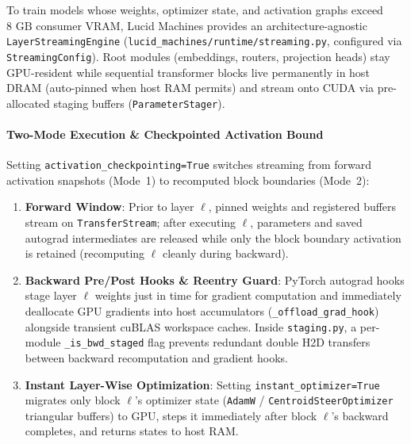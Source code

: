 \documentclass[10pt,twocolumn,letterpaper]{article}
\begin{document}
To train models whose weights, optimizer state, and activation graphs exceed $8\text{ GB}$ consumer VRAM, Lucid Machines provides an architecture-agnostic \texttt{LayerStreamingEngine} (\texttt{lucid\_machines/runtime/streaming.py}, configured via \texttt{StreamingConfig}). Root modules (embeddings, routers, projection heads) stay GPU-resident while sequential transformer blocks live permanently in host DRAM (auto-pinned when host RAM permits) and stream onto CUDA via pre-allocated staging buffers (\texttt{ParameterStager}).

\paragraph{Two-Mode Execution \& Checkpointed Activation Bound} Setting \texttt{activation\_checkpointing=True} switches streaming from forward activation snapshots (Mode~1) to recomputed block boundaries (Mode~2):
\begin{enumerate}
    \item \textbf{Forward Window}: Prior to layer $\ell$, pinned weights and registered buffers stream on \texttt{TransferStream}; after executing $\ell$, parameters and saved autograd intermediates are released while only the block boundary activation is retained (recomputing $\ell$ cleanly during backward).
    \item \textbf{Backward Pre/Post Hooks \& Reentry Guard}: PyTorch autograd hooks stage layer $\ell$ weights just in time for gradient computation and immediately deallocate GPU gradients into host accumulators (\texttt{\_offload\_grad\_hook}) alongside transient cuBLAS workspace caches. Inside \texttt{staging.py}, a per-module \texttt{\_is\_bwd\_staged} flag prevents redundant double H2D transfers between backward recomputation and gradient hooks.
    \item \textbf{Instant Layer-Wise Optimization}: Setting \texttt{instant\_optimizer=True} migrates only block $\ell$'s optimizer state (\texttt{AdamW} / \texttt{CentroidSteerOptimizer} triangular buffers) to GPU, steps it immediately after block $\ell$'s backward completes, and returns states to host RAM.
\end{enumerate}
\end{document}
